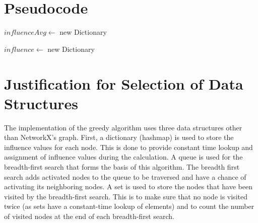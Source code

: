 \documentclass{article}
\begin{document}
\section{Pseudocode}

\begin{algorithm}[H]
\caption{$GreedyInfluenceMaximization(G, activationProbability, trials)$}
$influenceAvg \gets $ new Dictionary\;
\;
\end{algorithm}

\begin{algorithm}[H]
\caption{$HighDegreeHeuristicInfluenceMaximization(G)$}
$influence \gets $ new Dictionary\;
\;
\end{algorithm}

\section{Justification for Selection of Data Structures}

The implementation of the greedy algorithm uses three data structures other than NetworkX's graph.  First, a dictionary (hashmap) is used to store the influence values for each node.  This is done to provide constant time lookup and assignment of influence values during the calculation.  A queue is used for the breadth-first search that forms the basis of this algorithm.  The breadth first search adds activated nodes to the queue to be traversed and have a chance of activating its neighboring nodes.  A set is used to store the nodes that have been visited by the breadth-first search.  This is to make sure that no node is visited twice (as sets have a constant-time lookup of elements) and to count the number of visited nodes at the end of each breadth-first search. \\
\end{document}
